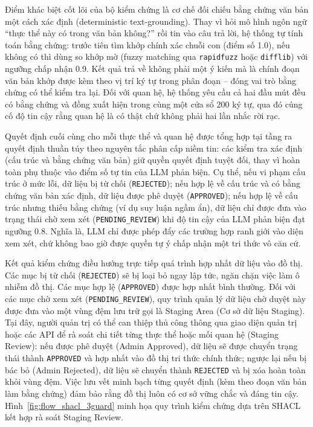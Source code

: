 \indent Điểm khác biệt cốt lõi của bộ kiểm chứng là cơ chế đối chiếu bằng chứng văn bản một cách xác định (deterministic text-grounding). Thay vì hỏi mô hình ngôn ngữ ``thực thể này có trong văn bản không?'' rồi tin vào câu trả lời, hệ thống tự tính toán bằng chứng: trước tiên tìm khớp chính xác chuỗi con (điểm số 1.0), nếu không có thì dùng so khớp mờ (fuzzy matching qua \texttt{rapidfuzz} hoặc \texttt{difflib}) với ngưỡng chấp nhận 0.9. Kết quả trả về không phải một ý kiến mà là chính đoạn văn bản khớp được kèm theo vị trí ký tự trong phân đoạn -- đóng vai trò bằng chứng có thể kiểm tra lại. Đối với quan hệ, hệ thống yêu cầu cả hai đầu mút đều có bằng chứng và đồng xuất hiện trong cùng một cửa sổ 200 ký tự, qua đó củng cố độ tin cậy rằng quan hệ là có thật chứ không phải hai lần nhắc rời rạc.

\indent Quyết định cuối cùng cho mỗi thực thể và quan hệ được tổng hợp tại tầng ra quyết định thuần túy theo nguyên tắc phân cấp niềm tin: các kiểm tra xác định (cấu trúc và bằng chứng văn bản) giữ quyền quyết định tuyệt đối, thay vì hoàn toàn phụ thuộc vào điểm số tự tin của LLM phản biện. Cụ thể, nếu vi phạm cấu trúc ở mức lỗi, dữ liệu bị từ chối (\texttt{REJECTED}); nếu hợp lệ về cấu trúc và có bằng chứng văn bản xác định, dữ liệu được phê duyệt (\texttt{APPROVED}); nếu hợp lệ về cấu trúc nhưng thiếu bằng chứng (ví dụ suy luận ngầm ẩn), dữ liệu chỉ được đưa vào trạng thái chờ xem xét (\texttt{PENDING\_REVIEW}) khi độ tin cậy của LLM phản biện đạt ngưỡng 0.8. Nghĩa là, LLM chỉ được phép đẩy các trường hợp ranh giới vào diện xem xét, chứ không bao giờ được quyền tự ý chấp nhận một tri thức vô căn cứ.

\indent Kết quả kiểm chứng điều hướng trực tiếp quá trình hợp nhất dữ liệu vào đồ thị. Các mục bị từ chối (\texttt{REJECTED}) sẽ bị loại bỏ ngay lập tức, ngăn chặn việc làm ô nhiễm đồ thị. Các mục hợp lệ (\texttt{APPROVED}) được hợp nhất bình thường. Đối với các mục chờ xem xét (\texttt{PENDING\_REVIEW}), quy trình quản lý dữ liệu chờ duyệt này được đưa vào một vùng đệm lưu trữ gọi là Staging Area (Cơ sở dữ liệu Staging). Tại đây, người quản trị có thể can thiệp thủ công thông qua giao diện quản trị hoặc các API để rà soát chi tiết từng thực thể hoặc mối quan hệ (Staging Review): nếu được phê duyệt (Admin Approved), dữ liệu sẽ được chuyển trạng thái thành \texttt{APPROVED} và hợp nhất vào đồ thị tri thức chính thức; ngược lại nếu bị bác bỏ (Admin Rejected), dữ liệu sẽ chuyển thành \texttt{REJECTED} và bị xóa hoàn toàn khỏi vùng đệm. Việc lưu vết minh bạch từng quyết định (kèm theo đoạn văn bản làm bằng chứng) đảm bảo rằng đồ thị luôn có cơ sở vững chắc và đáng tin cậy. Hình~\ref{fig:flow_shacl_3guard} minh họa quy trình kiểm chứng dựa trên SHACL kết hợp rà soát Staging Review.

